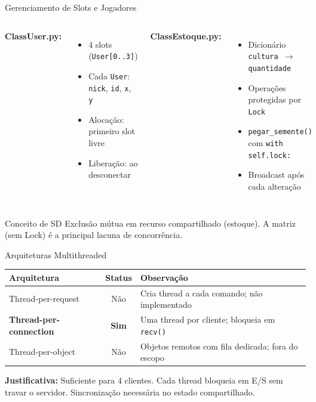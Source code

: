\documentclass[aspectratio=169]{beamer}
\begin{document}
\begin{frame}{Gerenciamento de Slots e Jogadores}
  \begin{columns}
    \textbf{ClassUser.py:}
    \begin{itemize}
      \item 4 slots (\texttt{User[0..3]})
      \item Cada \texttt{User}: \texttt{nick}, \texttt{id}, \texttt{x}, \texttt{y}
      \item Aloca\c{c}\~ao: primeiro slot livre
      \item Libera\c{c}\~ao: ao desconectar
    \end{itemize}
    \textbf{ClassEstoque.py:}
    \begin{itemize}
      \item Dicion\'ario \texttt{cultura $\rightarrow$ quantidade}
      \item Opera\c{c}\~oes protegidas por \texttt{Lock}
      \item \texttt{pegar\_semente()} com \texttt{with self.lock:}
      \item Broadcast ap\'os cada altera\c{c}\~ao
    \end{itemize}
  \end{columns}
  \vfill
  \begin{exampleblock}{Conceito de SD}
    Exclus\~ao m\'utua em recurso compartilhado (estoque). A matriz (sem Lock) \'e a principal lacuna de concorr\^encia.
  \end{exampleblock}
\end{frame}

\begin{frame}{Arquiteturas Multithreaded}
  \footnotesize
  \begin{tabular}{>{\raggedright\arraybackslash}p{4cm}c>{\raggedright\arraybackslash}p{7cm}}
    \toprule
    \textbf{Arquitetura} & \textbf{Status} & \textbf{Observa\c{c}\~ao} \\
    \midrule
    Thread-per-request & N\~ao & Cria thread a cada comando; n\~ao implementado \\
    \textbf{Thread-per-connection} & \textbf{Sim} & Uma thread por cliente; bloqueia em \texttt{recv()} \\
    Thread-per-object & N\~ao & Objetos remotos com fila dedicada; fora do escopo \\
    \bottomrule
  \end{tabular}
  \vfill
  \textbf{Justificativa:} Suficiente para 4 clientes. Cada thread bloqueia em E/S sem travar o servidor. Sincroniza\c{c}\~ao necess\'aria no estado compartilhado.
\end{frame}
\end{document}
